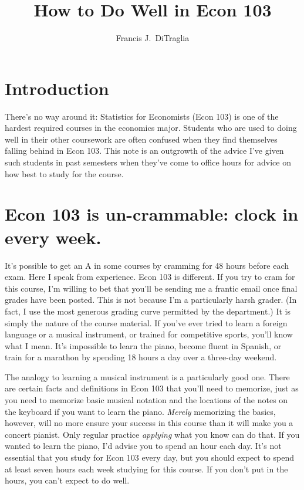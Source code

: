 \documentclass[12pt,letterpaper]{article}
\title{How to Do Well in Econ 103}
\author{Francis J.\ DiTraglia}
\date{}
\begin{document}
\maketitle

\section*{Introduction}
There's no way around it: Statistics for Economists (Econ 103) is one of the hardest required courses in the economics major. Students who are used to doing well in their other coursework are often confused when they find themselves falling behind in Econ 103. This note is an outgrowth of the advice I've given such students in past semesters when they've come to office hours for advice on how best to study for the course.  

\section{Econ 103 is un-crammable: clock in every week.}
It's possible to get an A in some courses by cramming for 48 hours before each exam. Here I speak from experience. Econ 103 is different. If you try to cram for this course, I'm willing to bet that you'll be sending me a frantic email once final grades have been posted. This is not because I'm a particularly harsh grader. (In fact, I use the most generous grading curve permitted by the department.) It is simply the nature of the course material. If you've ever tried to learn a foreign language or a musical instrument, or trained for competitive sports, you'll know what I mean. It's impossible to learn the piano, become fluent in Spanish, or train for a marathon by spending 18 hours a day over a three-day weekend. 

The analogy to learning a musical instrument is a particularly good one. There are certain facts and definitions in Econ 103 that you'll need to memorize, just as you need to memorize basic musical notation and the locations of the notes on the keyboard if you want to learn the piano. \emph{Merely} memorizing the basics, however, will no more ensure your success in this course than it will make you a concert pianist. Only regular practice \emph{applying} what you know can do that. If you wanted to learn the piano, I'd advise you to spend an hour each day. It's not essential that you study for Econ 103 every day, but you should expect to spend at least seven hours each week studying for this course. If you don't put in the hours, you can't expect to do well.
\end{document}
